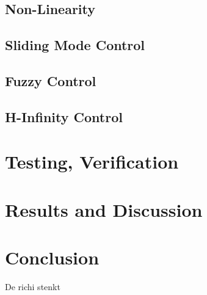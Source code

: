 \documentclass[conference]{IEEEtran}
\begin{document}
\subsection{Non-Linearity}
\subsection{Sliding Mode Control}
\subsection{Fuzzy Control}
\subsection{H-Infinity Control}

\section{Testing, Verification}


\section{Results and Discussion}




\section{Conclusion}

De richi stenkt 
\end{document}
